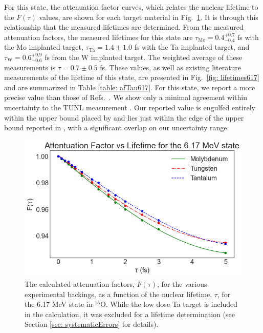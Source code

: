 For this state, the attenuation factor curves, which relates the nuclear lifetime to the $F(\tau)$ values, are shown for each target material in Fig.\ \ref{fig: attFacs617}. It is through this relationship that the measured lifetimes are determined. From the measured attenuation factors, the measured lifetimes for this state are $\tau_{\text{Mo}} = 0.4^{+0.7}_{-0.4}$ fs with the Mo implanted target, $\tau_{\text{Ta}} = 1.4 \pm 1.0$ fs with the Ta implanted target, and $\tau_{\text{W}} = 0.6^{+0.9}_{-0.6}$ fs from the W implanted target. The weighted average of these measurements is $\overline{\tau} = 0.7 \pm 0.5$ fs. These values, as well as existing literature measurements of the lifetime of this state, are presented in Fig.\ \ref{fig: lifetimes617} and are summarized in Table \ref{table: afTau617}. For this state, we report a more precise value than those of Refs.\ \cite{Bertone2001, Schurmann2008, Galinski2014, Sharma2020}. We show only a minimal agreement within uncertainty to the TUNL measurement \cite{Bertone2001}. Our reported value is engulfed entirely within the upper bound placed by \cite{Galinski2014} and lies just within the edge of the upper bound reported in \cite{Schurmann2008, Sharma2020}, with a significant overlap on our uncertainty range.


\begin{figure}
\centering
\includegraphics[width=\linewidth]{figures/attFac617.png}
\caption{The calculated attenuation factors, $F(\tau)$, for the various experimental backings, as a function of the nuclear lifetime, $\tau$, for the 6.17 MeV state in $^{15}$O. While the low dose Ta target is included in the calculation, it was excluded for a lifetime determination (see Section \ref{sec: systematicErrors} for details).}
\label{fig: attFacs617}
\end{figure}


